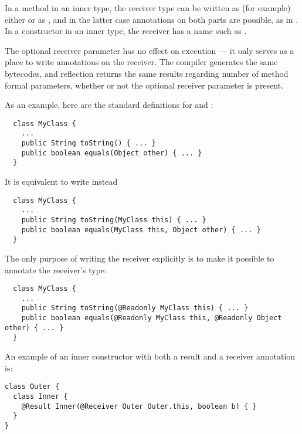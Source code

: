 \documentclass[10pt]{article}
\begin{document}
\begin{enumerate}



  In a method in an inner type,
  the receiver type can be
  written as (for example) either  or as ,
  and in the latter case annotations on both parts are possible, as in
  .
  In a constructor in an inner type, the receiver
  has a name such as .

  The optional receiver parameter has no effect on execution --- it only
  serves as a place to write annotations on the receiver.  The compiler
  generates the same bytecodes, and reflection returns the same results
  regarding number of method formal parameters, whether or not the optional
  receiver parameter is present.


  As an example, here are the standard definitions for  and :
\preverbnegspace
\begin{Verbatim}
  class MyClass {
    ...
    public String toString() { ... }
    public boolean equals(Object other) { ... }
  }
\end{Verbatim}

\noindent
It is equivalent to write instead

\preverbnegspace
\begin{Verbatim}
  class MyClass {
    ...
    public String toString(MyClass this) { ... }
    public boolean equals(MyClass this, Object other) { ... }
  }
\end{Verbatim}

\noindent
The only purpose of writing the receiver explicitly is to make it
possible to annotate the receiver's type:

\preverbnegspace
\begin{Verbatim}
  class MyClass {
    ...
    public String toString(@Readonly MyClass this) { ... }
    public boolean equals(@Readonly MyClass this, @Readonly Object other) { ... }
  }
\end{Verbatim}

An example of an inner constructor with both a result and a receiver
annotation is:

\preverbnegspace
\begin{Verbatim}
class Outer {
  class Inner {
    @Result Inner(@Receiver Outer Outer.this, boolean b) { }
  }
}
\end{Verbatim}


\end{enumerate}
\end{document}
